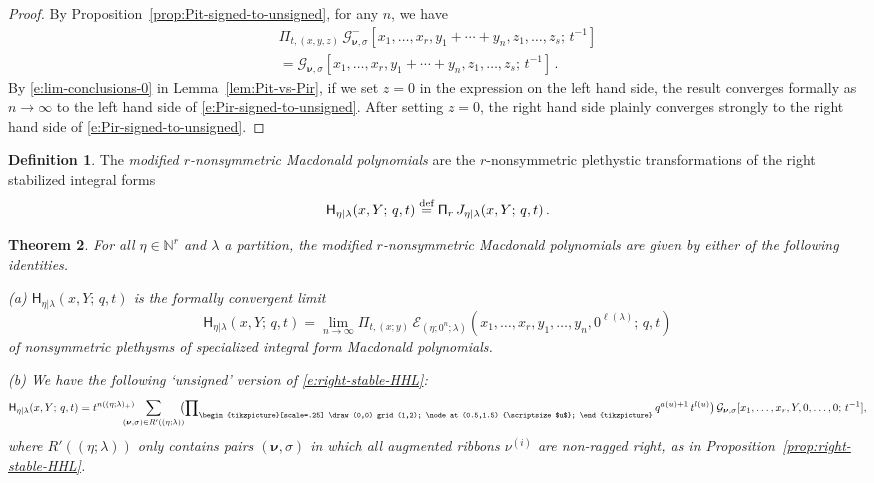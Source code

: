 \documentclass[12pt]{amsart}
\newtheorem{thm}{Theorem}[subsection]
\theoremstyle{definition}
\newtheorem{defn}[thm]{Definition}
\theoremstyle{remark}
\newcommand{\NN}{{\mathbb N}}
\newcommand{\nubold}{{\boldsymbol \nu }}
\newcommand{\Ecal}{{\mathcal E}}
\newcommand{\Gcal}{{\mathcal G}}
\newcommand{\Pisf}{{\mathsf \Pi }}
\newcommand{\domino}{\begin{tikzpicture}[scale=.25]
\draw (0,0) grid (1,2);
\node at (0.5,1.5) {\scriptsize $u$};
\end{tikzpicture}}
\newcommand{\defeq}{\mathrel{\overset{\text{{\rm def}}}{=}}}
\newcommand{\mE}{\mathsf H}   %
\newcommand{\Jns}{J}           %
\begin{document}
\begin{proof}
By Proposition~\ref{prop:Pit-signed-to-unsigned}, for any $n$, we have
\begin{multline}\label{e:xyz-signed-to-unsigned}
\Pi _{t,(x,y,z)}\, \Gcal ^{-} _{\nubold ,\sigma
}[x_{1},\ldots,x_{r},y_{1}+\cdots +y_{n},z_{1},\ldots,z_{s};\, t^{-1}]
\\
= \Gcal _{\nubold ,\sigma }[x_{1},\ldots,x_{r},y_{1}+\cdots
+y_{n},z_{1}, \ldots, z_{s};\, t^{-1}]\, .
\end{multline}
By \eqref{e:lim-conclusions-0} in Lemma~\ref{lem:Pit-vs-Pir}, if we
set $z = 0$ in the expression on the left hand side, the result
converges formally as $n\rightarrow \infty $ to the left hand side of
\eqref{e:Pir-signed-to-unsigned}.  After setting $z=0$, the right hand
side plainly converges strongly to the right hand side of
\eqref{e:Pir-signed-to-unsigned}.
\end{proof}

\begin{defn}\label{def:mod-mac}
The {\em modified $r$-nonsymmetric Macdonald polynomials} are the
$r$-nonsymmetric plethystic transformations of the right stabilized
integral forms
\begin{equation}\label{e:H-eta-lambda}
\mE _{\eta |\lambda }(x,Y;\, q,t) \defeq \Pisf _{r}\, \Jns _{\eta
|\lambda }(x,Y;\, q,t)\, .
\end{equation}
\end{defn}


\begin{thm}\label{thm:mod-mac}
For all $\eta \in \NN ^{r}$ and $\lambda $ a partition, the
modified $r$-nonsymmetric Macdonald polynomials
are given by either of the following identities.

(a) $\mE _{\eta |\lambda }(x,Y;\, q,t)$ is the formally convergent
limit
\begin{equation}\label{e:mod-mac-lim}
 \mE _{\eta |\lambda }(x,Y;\, q,t) = \lim_{n\rightarrow \infty } \Pi
_{t,(x;y)}\, \Ecal _{(\eta ;0^{n};\lambda
)}(x_{1},\ldots,x_{r},y_{1},\ldots,y_{n}, 0^{\ell (\lambda )};\, q,t)
\end{equation}
of nonsymmetric plethysms of specialized integral form Macdonald
polynomials.

(b) We have the following `unsigned' version of
\eqref{e:right-stable-HHL}:
\begin{equation}\label{e:mod-mac-HHL}
\mE _{\eta |\lambda }(x,Y;\, q,t) = t^{n((\eta ;\lambda ) _{+})}
\hspace{-3ex} \sum _{(\nubold ,\sigma )\in R'((\eta ;\lambda
))}\hspace{-1ex} \bigl( \prod \nolimits_{\domino } q^{a(u)+1}\,
t^{l(u)} \bigr)\, \Gcal _{\nubold ,\sigma }[x_{1}, \ldots, x_{r}, Y,
0,\ldots,0;\, t^{-1}],
\end{equation}
where $R'((\eta ;\lambda ))$ only contains pairs $(\nubold ,\sigma )$
in which all augmented ribbons $\nu ^{(i)}$ are non-ragged right, as
in Proposition~\ref{prop:right-stable-HHL}.
\end{thm}
\end{document}
